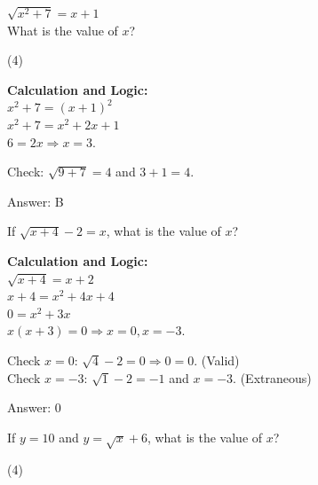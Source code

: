 \documentclass[11pt,paper=a4,answers]{exam}
\begin{document}
\begin{questions}
\question
$\sqrt{x^2 + 7} = x + 1$ \\
What is the value of $x$?
\begin{tasks}(4)
\end{tasks}

\begin{solution}
\textbf{Calculation and Logic:} \\
$x^2 + 7 = (x + 1)^2$ \\
$x^2 + 7 = x^2 + 2x + 1$ \\
$6 = 2x \Rightarrow x = 3$.

\vspace{10pt}

Check: $\sqrt{9+7} = 4$ and $3+1 = 4$.

\vspace{25pt}

Answer: \colorbox{yellow!100}{B}
\end{solution}

\vspace{40pt}

\question
If $\sqrt{x+4} - 2 = x$, what is the value of $x$?

\begin{solution}
\textbf{Calculation and Logic:} \\
$\sqrt{x+4} = x + 2$ \\
$x + 4 = x^2 + 4x + 4$ \\
$0 = x^2 + 3x$ \\
$x(x+3) = 0 \Rightarrow x = 0, x = -3$.

\vspace{10pt}

Check $x = 0$: $\sqrt{4}-2 = 0 \Rightarrow 0 = 0$. (Valid) \\
Check $x = -3$: $\sqrt{1}-2 = -1$ and $x = -3$. (Extraneous)

\vspace{25pt}

Answer: \colorbox{yellow!100}{0}
\end{solution}

\vspace{40pt}

\question
If $y = 10$ and $y = \sqrt{x} + 6$, what is the value of $x$?
\begin{tasks}(4)
\end{tasks}


\end{questions}
\end{document}
